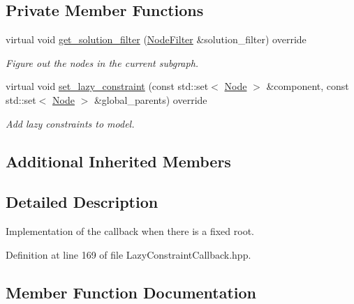 \subsection*{Private Member Functions}
\begin{DoxyCompactItemize}
\item 
virtual void \hyperlink{classderegnet_1_1LazyConstraintCallbackRoot_afae052e08a40da4a0af8b35887b8715e}{get\+\_\+solution\+\_\+filter} (\hyperlink{namespacederegnet_a50db1f8fc7c6a954d825d9e1ed9ad302}{Node\+Filter} \&solution\+\_\+filter) override
\begin{DoxyCompactList}\small\item\em Figure out the nodes in the current subgraph. \end{DoxyCompactList}\item 
virtual void \hyperlink{classderegnet_1_1LazyConstraintCallbackRoot_a8cfcc3df75b7a06a9885c7f6c5286344}{set\+\_\+lazy\+\_\+constraint} (const std\+::set$<$ \hyperlink{namespacederegnet_a744bad34f2de9856d36715a445f027f3}{Node} $>$ \&component, const std\+::set$<$ \hyperlink{namespacederegnet_a744bad34f2de9856d36715a445f027f3}{Node} $>$ \&global\+\_\+parents) override
\begin{DoxyCompactList}\small\item\em Add lazy constraints to model. \end{DoxyCompactList}\end{DoxyCompactItemize}
\subsection*{Additional Inherited Members}


\subsection{Detailed Description}
Implementation of the callback when there is a fixed root. 

Definition at line 169 of file Lazy\+Constraint\+Callback.\+hpp.



\subsection{Member Function Documentation}
\mbox{\label{classderegnet_1_1LazyConstraintCallbackRoot_afae052e08a40da4a0af8b35887b8715e}} 
